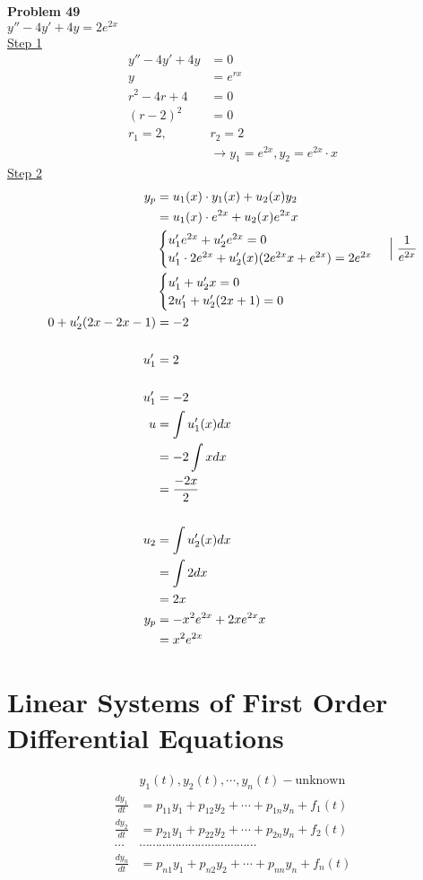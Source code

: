 \documentclass[10pt, letterpaper]{article}
\begin{document}
\textbf{Problem 49}\\
$y''-4y'+4y=2e^{2x}$\\
\underline{Step 1}
\begin{align*}
y''-4y'+4y &= 0\\
y &= e^{rx}\\
r^2-4r+4 &= 0\\
(r-2)^2 &= 0\\
r_1=2, & r_2=2\\
&\rightarrow y_1=e^{2x}, y_2=e^{2x}\cdot x
\end{align*}
\underline{Step 2}
\begin{align*}
y_p &= u_1(x) \cdot y_1(x) +u_2(x)y_2\\
&= u_1(x) \cdot e^{2x} +u_2(x)e^{2x}x\\
&\begin{cases}
	u_1'e^{2x} +u_2'e^{2x} =0\\
	u_1' \cdot 2e^{2x} + u_2'(x)(2e^{2x}x+e^{2x})=2e^{2x}
\end{cases}
\Bigm| \frac{1}{e^{2x}}\\
&\begin{cases}
	u_1'+u_2'x=0\\
	2u_1'+u_2'(2x+1)=0
\end{cases}\\
0+u_2'(2x-2x-1) &= -2\\
\\
u_1' &= 2\\
\\
u_1' &= -2\\
u &= \int \limits u_1'(x)dx\\
&= -2 \int \limits x dx\\
&= \frac{-2x}{2}\\
\\
u_2 &= \int \limits u_2'(x)dx\\
&= \int \limits 2 dx\\
&= 2x\\
y_p &= -x^2e^{2x} +2xe^{2x}x\\
&= x^2e^{2x}
\end{align*}

\section{Linear Systems of First Order Differential Equations}
\begin{align*}
&y_1(t), y_2(t), \cdots, y_n(t) - \text{unknown}\\
\frac{dy_1}{dt} &= p_{11}y_1 +p_{12}y_2 +\cdots +p_{1n}y_n +f_1(t)\\
\frac{dy_2}{dt} &= p_{21}y_1 +p_{22}y_2 +\cdots +p_{2n}y_n +f_2(t)\\
\cdots & \cdots \cdots \cdots \cdots \cdots \cdots \cdots \cdots \cdots \cdots \cdots \cdots\\
\frac{dy_n}{dt} &= p_{n1}y_1 +p_{n2}y_2 +\cdots +p_{nn}y_n +f_n(t)
\end{align*}
\end{document}

